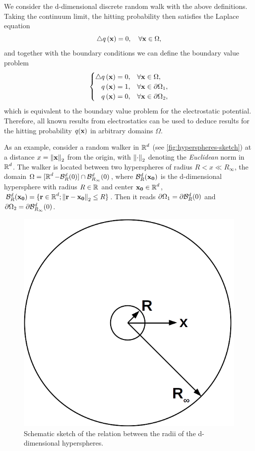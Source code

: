 \noindent We consider the d-dimensional discrete random walk with the above definitions. Taking the continuum limit, the hitting probability then satisfies the Laplace equation
\begin{equation*}
 \mathop{}\!\mathbin\bigtriangleup q\left(\mathbf{x}\right) = 0,\quad \forall \mathbf{x}\in\Omega,
\end{equation*}
and together with the boundary conditions we can define the boundary value problem
\begin{equation}\label{eq:bvp-hittingprob}
 \begin{cases}
  \hfill\Laplace q\bra{\bv{x}} = 0, & \forall \bv{x}\in\Omega,\\
  \hfill q\bra{\bv{x}} = 1, & \forall \bv{x}\in\partial\Omega_1,\\
  \hfill q\bra{\bv{x}} = 0, & \forall \bv{x}\in\partial\Omega_2,
 \end{cases}
\end{equation}
which is equivalent to the boundary value problem for the electrostatic potential. Therefore, all known results from electrostatics can be used to deduce results for the hitting probability $q(\mathbf{x})$ in arbitrary domains $\Omega$.

As an example, consider a random walker in $\operatorname{\mathbb{R}}^d$ (see \autoref{fig:hyperspheres-sketch}) at a distance $x = \left\|\mathbf{x}\right\|_2$ from the origin, with $\left\|\cdot\right\|_2$ denoting the \textit{Euclidean} norm in $\operatorname{\mathbb{R}}^d$. The walker is located between two hyperspheres of radius $R<x\ll R_\infty$, \ie the domain \mbox{$\Omega = [\operatorname{\mathbb{R}}^d - \mathcal{B}_R^d(0)] \cap \mathcal{B}_{R_\infty}^d(0)$}, where $\mathcal{B}_R^d(\mathbf{x_0})$ is the d-dimensional hypersphere with radius $R \in \operatorname{\mathbb{R}}$ and center $\mathbf{x_0} \in \operatorname{\mathbb{R}}^d$, \ie \mbox{$\mathcal{B}_R^d(\mathbf{x_0}) = \{\mathbf{r} \in \operatorname{\mathbb{R}}^d; \left\|\mathbf{r}-\mathbf{x_0}\right\|_2 \leq R\}$}. Then it reads $\partial\Omega_1 = \partial\mathcal{B}_R^d(0)$ and $\partial\Omega_2=\partial\mathcal{B}_{R_\infty}^d(0)$.

\begin{figure}[bth]
 \myfloatalign
 \includegraphics[width=0.4\linewidth]{gfx/hyperspheres}
 \caption[Sketch of radii relations]{Schematic sketch of the relation between the radii of the d-dimensional hyperspheres.}\label{fig:hyperspheres-sketch}
\end{figure}

